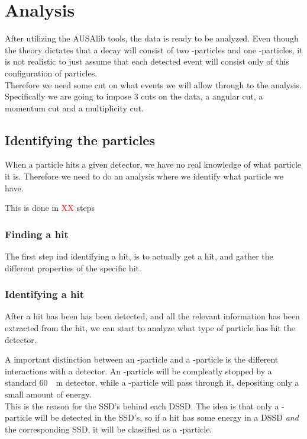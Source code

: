 \chapter{Analysis}
After utilizing the AUSAlib tools, the data is ready to be analyzed. Even though the theory dictates that a decay will consist of two \al-particles and one \be-particles, it is not realistic to just assume that each detected event will consist only of this configuration of particles. \\
Therefore we need some cut on what events we will allow through to the analysis. Specifically we are going to impose 3 cuts on the data, a angular cut, a momentum cut and a multiplicity cut.

\section{Identifying the particles}
When a particle hits a given detector, we have no real knowledge of what particle it is. 
Therefore we need to do an analysis where we identify what particle we have.

This is done in \textcolor{red}{XX} steps
\subsection{Finding a hit}
The first step ind identifying a hit, is to actually get a hit, and gather the different properties of the specific hit. 

\subsection{Identifying a hit}
After a hit has been has been detected, and all the relevant information has been extracted from the hit, we can start to analyze what type of particle has hit the detector. 

A important distinction between an \al-particle and a \be-particle is the different interactions with a detector. An \al-particle will be compleatly stopped by a standard \SI{60}{\mu m} detector, while a \be-particle will pass through it, depositing only a small amount of energy. \\
This is the reason for the SSD's behind each DSSD. The idea is that only a \be-particle will be detected in the SSD's, so if a hit has some energy in a DSSD \textit{and} the corresponding SSD, it will be classified as a \be-particle.





